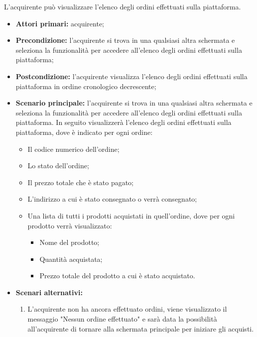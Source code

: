 
\label{visualizzazione-ordini-effettuati}

L'acquirente può visualizzare l'elenco degli ordini effettuati sulla piattaforma.
\begin{itemize}
    \item \textbf{Attori primari:} acquirente;
    \item \textbf{Precondizione:} l'acquirente si trova in una qualsiasi altra schermata e seleziona la funzionalità per accedere all'elenco degli ordini effettuati sulla piattaforma;
    \item \textbf{Postcondizione:} l'acquirente visualizza l'elenco degli ordini effettuati sulla piattaforma in ordine cronologico decrescente;
    \item \textbf{Scenario principale:} l'acquirente si trova in una qualsiasi altra schermata e seleziona la funzionalità per accedere all'elenco degli ordini effettuati sulla piattaforma. In seguito visualizzerà l'elenco degli ordini effettuati sulla piattaforma, dove è indicato per ogni ordine:
    \begin{itemize}
        \item Il codice numerico dell'ordine;
        \item Lo stato dell'ordine;
        \item Il prezzo totale che è stato pagato;
        \item L'indirizzo a cui è stato consegnato o verrà consegnato;
        \item Una lista di tutti i prodotti acquistati in quell'ordine, dove per ogni prodotto verrà visualizzato:
        \begin{itemize}
            \item Nome del prodotto;
            \item Quantità acquistata;
            \item Prezzo totale del prodotto a cui è stato acquistato.
        \end{itemize}
    \end{itemize}
    \item \textbf{Scenari alternativi:} 
    \begin{enumerate}[label=\lett]
        \item L'acquirente non ha ancora effettuato ordini, viene visualizzato il messaggio "Nessun ordine effettuato" e sarà data la possibilità all'acquirente di tornare alla schermata principale per iniziare gli acquisti.
    \end{enumerate}
\end{itemize}

